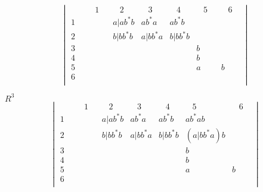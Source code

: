 \documentclass[a4paper,12pt]{article} %
\begin{document}
\[\begin{vmatrix}
\hspace{15pt}&\hspace{10pt}1\hspace{10pt}&\hspace{10pt}2\hspace{10pt}&\hspace{10pt}3\hspace{10pt}&\hspace{10pt}4\hspace{10pt}&\hspace{10pt}5\hspace{10pt}&\hspace{10pt}6\hspace{10pt}\\
1& & a|ab^*b & ab^*a & ab^*b \\
2& & b|bb^*b & a|bb^*a & b|bb^*b\\
3& & & & & b\\
4& & & & & b\\
5& & & & & a & b\\
6& \\
\end{vmatrix}
\]


$R^3$\\

\[\begin{vmatrix}
\hspace{15pt}&\hspace{10pt}1\hspace{10pt}&\hspace{10pt}2\hspace{10pt}&\hspace{10pt}3\hspace{10pt}&\hspace{10pt}4\hspace{10pt}&\hspace{10pt}5\hspace{10pt}&\hspace{10pt}6\hspace{10pt}\\
1& & a|ab^*b & ab^*a & ab^*b & ab^*ab\\
2& & b|bb^*b & a|bb^*a & b|bb^*b & (a|bb^*a)b\\
3& & & & & b\\
4& & & & & b\\
5& & & & & a & b\\
6& \\
\end{vmatrix}
\]
\end{document}
